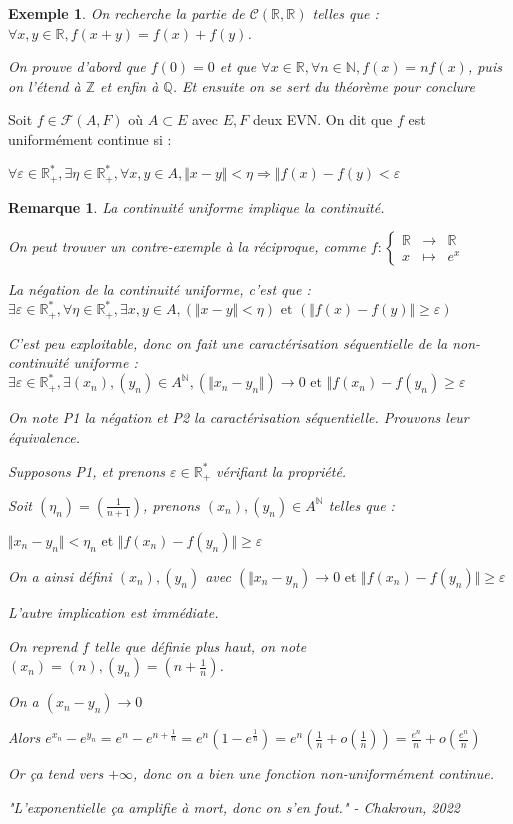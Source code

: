 \documentclass[a4paper,12pt]{book}
\newcommand{\Def}[2]{\begin{tcolorbox}[sharp corners, colback=white,colframe=blue!90!black!75, title=Définition : #1]#2\end{tcolorbox}}
\newtheorem{Exe}{Exemple}[section]
\newtheorem{Rem}{Remarque}[section]
\def\R{\mathbb{R}}
\def\Q{\mathbb{Q}}
\def\N{\mathbb{N}}
\def\Z{\mathbb{Z}}
\begin{document}
\begin{Exe}
On recherche la partie de $\mathcal{C}(\R,\R)$ telles que : $\forall x,y\in\R, f(x+y)=f(x)+f(y)$. \par On prouve d'abord que $f(0)=0$ et que $\forall x\in\R,\forall n\in\N, f(x)=nf(x)$, puis on l'étend à $\Z$ et enfin à $\Q$. Et ensuite on se sert du théorème pour conclure
\end{Exe}
\Def{Uniforme continuité}{Soit $f\in\mathcal{F}(A,F)$ où $A\subset E$ avec $E,F$ deux EVN. On dit que $f$ est uniformément continue si :
\par\begin{center} $\forall\varepsilon\in\R_+^*,\exists\eta\in\R_+^*,\forall x,y\in A,\Vert x-y\Vert<\eta\Rightarrow\Vert f(x)-f(y)<\varepsilon$\end{center}}
\begin{Rem}
La continuité uniforme implique la continuité. \par On peut trouver un contre-exemple à la réciproque, comme $f:\left\{\begin{array}{rcl} \R & \to & \R \\ x & \mapsto & e^x\end{array}\right.$ \par La négation de la continuité uniforme, c'est que : $\exists\varepsilon\in\R_+^*,\forall\eta\in\R_+^*,\exists x,y\in A, (\Vert x-y\Vert<\eta)\text{ et }(\Vert f(x)-f(y)\Vert\geq\varepsilon)$
\par C'est peu exploitable, donc on fait une caractérisation séquentielle de la non-continuité uniforme : $\exists\varepsilon\in\R_+^*,\exists(x_n),(y_n)\in A^\N, (\Vert x_n-y_n\Vert)\to 0\text{ et }\Vert f(x_n)-f(y_n)\geq\varepsilon$ \par On note P1 la négation et P2 la caractérisation séquentielle. Prouvons leur équivalence. \par Supposons P1, et prenons $\varepsilon\in\R_+^*$ vérifiant la propriété. 
\par Soit $(\eta_n)=(\frac{1}{n+1})$, prenons $(x_n), (y_n)\in A^\N$ telles que :\par $\Vert x_n-y_n\Vert<\eta_n\text{ et }\Vert f(x_n)-f(y_n)\Vert\geq\varepsilon$ \par On a ainsi défini $(x_n),(y_n)$ avec $(\Vert x_n-y_n)\to 0\text{ et }\Vert f(x_n)-f(y_n)\Vert\geq\varepsilon$
\par L'autre implication est immédiate. \par On reprend $f$ telle que définie plus haut, on note $(x_n)=(n), (y_n)=(n+\frac{1}{n})$. \par On a $(x_n-y_n)\to 0$ 
\par Alors $e^{x_n}-e^{y_n}=e^{n}-e^{n+\frac{1}{n}}=e^{n}(1-e^{\frac{1}{n}})=e^{n}(\frac{1}{n}+o(\frac{1}{n}))=\frac{e^{n}}{n}+o(\frac{e^{n}}{n})$ \par Or ça tend vers $+\infty$, donc on a bien une fonction non-uniformément continue.
\par "L'exponentielle ça amplifie à mort, donc on s'en fout." - Chakroun, 2022
\end{Rem}
\end{document}
